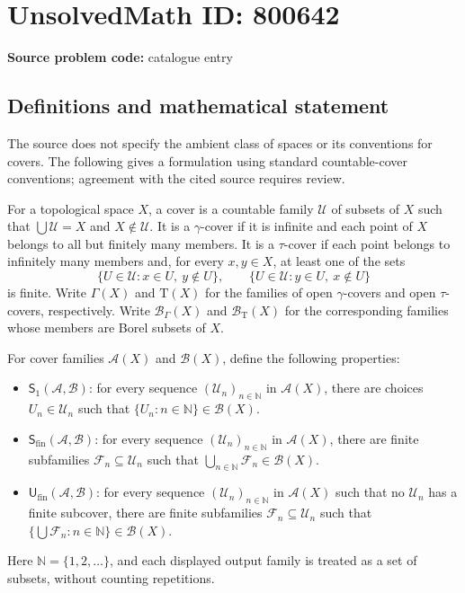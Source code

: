 \documentclass[11pt]{article}
\newcommand{\N}{\mathbb{N}}
\begin{document}
\section*{UnsolvedMath ID: 800642}
\textbf{Source problem code:} catalogue entry
\subsection{Definitions and mathematical statement}
The source does not specify the ambient class of spaces or its conventions for covers. The following gives a formulation using standard countable-cover conventions; agreement with the cited source requires review.

For a topological space \(X\), a cover is a countable family \(\mathcal U\) of subsets of \(X\) such that \(\bigcup\mathcal U=X\) and \(X\notin\mathcal U\). It is a \(\gamma\)-cover if it is infinite and each point of \(X\) belongs to all but finitely many members. It is a \(\tau\)-cover if each point belongs to infinitely many members and, for every \(x,y\in X\), at least one of the sets
\[
\{U\in\mathcal U:x\in U,\ y\notin U\},\qquad
\{U\in\mathcal U:y\in U,\ x\notin U\}
\]
is finite. Write \(\Gamma(X)\) and \(\mathrm T(X)\) for the families of open \(\gamma\)-covers and open \(\tau\)-covers, respectively. Write \(\mathcal B_\Gamma(X)\) and \(\mathcal B_{\mathrm T}(X)\) for the corresponding families whose members are Borel subsets of \(X\).

For cover families \(\mathcal A(X)\) and \(\mathcal B(X)\), define the following properties:
\begin{itemize}
\item \(\mathsf S_1(\mathcal A,\mathcal B)\): for every sequence \((\mathcal U_n)_{n\in\N}\) in \(\mathcal A(X)\), there are choices \(U_n\in\mathcal U_n\) such that \(\{U_n:n\in\N\}\in\mathcal B(X)\).
\item \(\mathsf S_{\mathrm{fin}}(\mathcal A,\mathcal B)\): for every sequence \((\mathcal U_n)_{n\in\N}\) in \(\mathcal A(X)\), there are finite subfamilies \(\mathcal F_n\subseteq\mathcal U_n\) such that \(\bigcup_{n\in\N}\mathcal F_n\in\mathcal B(X)\).
\item \(\mathsf U_{\mathrm{fin}}(\mathcal A,\mathcal B)\): for every sequence \((\mathcal U_n)_{n\in\N}\) in \(\mathcal A(X)\) such that no \(\mathcal U_n\) has a finite subcover, there are finite subfamilies \(\mathcal F_n\subseteq\mathcal U_n\) such that \(\{\bigcup\mathcal F_n:n\in\N\}\in\mathcal B(X)\).
\end{itemize}
Here \(\N=\{1,2,\ldots\}\), and each displayed output family is treated as a set of subsets, without counting repetitions.
\end{document}

